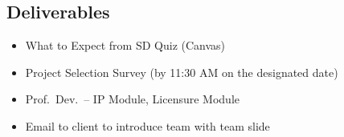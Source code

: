 \subsection{Deliverables}
\begin{itemize}[nosep,leftmargin=1.5em]
\item What to Expect from SD Quiz (Canvas)
\item Project Selection Survey (by 11:30 AM on the designated date)
\item Prof.~Dev.~-- IP Module, Licensure Module
\item Email to client to introduce team with team slide
\end{itemize}



